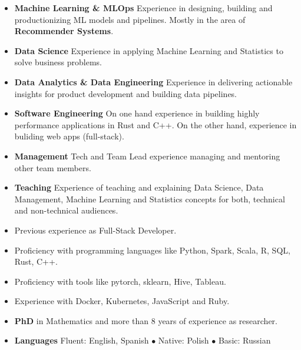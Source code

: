\documentclass[a4paper, oneside]{scrreprt}
\begin{document}
\begin{itemize}
\item \textbf{Machine Learning \& MLOps} Experience in designing, building and productionizing ML models and pipelines. 
Mostly in the area of \textbf{Recommender Systems}.
\item \textbf{Data Science} Experience in applying Machine Learning and Statistics to solve business problems.
\item \textbf{Data Analytics \& Data Engineering} Experience in delivering actionable insights for product development and building data pipelines.
\item \textbf{Software Engineering} On one hand experience in building highly performance applications in Rust and C++. On the
  other hand, experience in buliding web apps (full-stack).
\item \textbf{Management} Tech and Team Lead experience managing and mentoring other team members.
\item \textbf{Teaching} Experience of teaching and explaining Data Science, Data Management, Machine Learning and
  Statistics concepts for both, technical and non-technical audiences. %
\item Previous experience as Full-Stack Developer.
\item Proficiency with programming languages like Python, Spark, Scala, R, SQL, Rust, C++.
\item Proficiency with tools like pytorch, sklearn, Hive, Tableau.
\item Experience with Docker, Kubernetes, JavaScript and Ruby. 
\item \textbf{PhD} in Mathematics and more than 8 years of experience as researcher. 
\item \textbf{Languages} Fluent: English, Spanish $\bullet$ Native: Polish  $\bullet$ Basic: Russian 
\end{itemize}
\vspace{-0.1cm}
\noindent\makebox[\linewidth]{\rule{\textwidth}{0.4pt}}
\vspace{-0.1cm}
\end{document}
